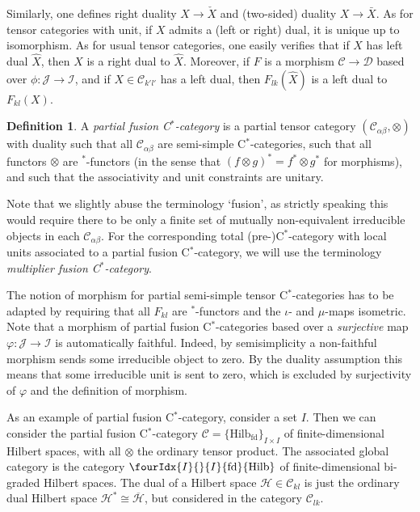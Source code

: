 \documentclass[10pt]{article}
\DeclareMathOperator{\fin}{\mathrm{fd}}
\newcommand{\Hsp}{\mathcal{H}}
\newcommand{\CatC}{\mathcal{C}}
\newcommand{\CatCC}{\mathscr{C}}
\newcommand{\CatDD}{\mathscr{D}}
\newcommand{\Hilb}{\mathrm{Hilb}}
\newcommand{\Hilbif}{\Gr{\mathrm{Hilb}}{I}{I}{}{\fin}}
\newcommand{\Gr}[5]{\fourIdx{#2}{#4}{#3}{#5}{#1}}%
\theoremstyle{definition}
\newtheorem{Def}[Theorem]{Definition}
\numberwithin{equation}{section}
\begin{document}
Similarly, one defines right duality $X\rightarrow \check{X}$ and (two-sided) duality $X\rightarrow \bar{X}$. As for tensor categories with unit, if $X$ admits a (left or right) dual, it is unique up to isomorphism. As for usual tensor categories, one easily verifies that if $X$ has left dual $\hat{X}$, then $X$ is a right dual to $\hat{X}$. Moreover, if $F$ is a morphism $\CatCC\rightarrow \CatDD$ based over $\phi:\mathscr{J}\rightarrow \mathscr{I}$, and if $X\in \CatC_{k'l'}$ has a left dual, then $F_{lk}(\hat{X})$ is a left dual to $F_{kl}(X)$.

\begin{Def} A \emph{partial fusion C$^*$-category} is a partial tensor category $(\CatC_{\alpha\beta},\otimes)$ with duality such that all $\CatC_{\alpha\beta}$ are semi-simple C$^*$-categories, such that all functors $\otimes$ are $^*$-functors (in the sense that $(f\otimes g)^* = f^*\otimes g^*$ for morphisms), and such that the associativity and unit constraints are unitary.
\end{Def} 

Note that we slightly abuse the terminology `fusion', as strictly speaking this would require there to be only a finite set of mutually non-equivalent irreducible objects in each $\CatC_{\alpha\beta}$. For the corresponding total (pre-)C$^*$-category with local units associated to a partial fusion C$^*$-category, we will use the terminology \emph{multiplier fusion C$^*$-category}.

The notion of morphism for partial semi-simple tensor C$^*$-categories has to be adapted by requiring that all $F_{kl}$ are $^*$-functors and the $\iota$- and $\mu$-maps isometric.  Note that a morphism of partial fusion C$^*$-categories based over a \emph{surjective} map $\varphi: \mathscr{J}\rightarrow \mathscr{I}$ is automatically faithful. Indeed, by semisimplicity a non-faithful morphism sends some irreducible object to zero. By the duality assumption this means that some irreducible unit is sent to zero, which is excluded by surjectivity of $\varphi$ and the definition of morphism.

As an example of partial fusion C$^*$-category, consider a set  $I$. Then we can consider the partial fusion C$^*$-category $\CatCC = \{\Hilb_{\fin}\}_{I\times I}$ of finite-dimensional Hilbert spaces, with all $\otimes$ the ordinary tensor product. The associated global category is the category $\Hilbif$ of finite-dimensional bi-graded Hilbert spaces. The dual of a Hilbert space $\Hsp \in \CatC_{kl}$ is just the ordinary dual Hilbert space $\Hsp^* \cong \overline{\Hsp}$, but considered in the category $\CatC_{lk}$. 
\end{document}
